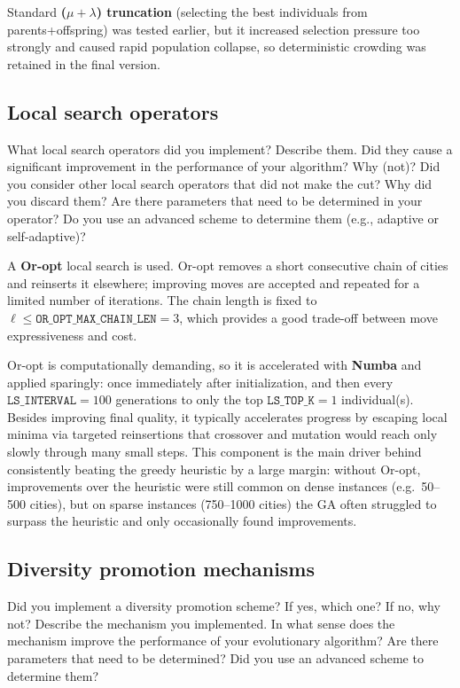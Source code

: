 \documentclass[a4paper,10pt]{article}
\newcommand{\ReplaceMe}[1]{{\color{blue}#1}}
\begin{document}
Standard \textbf{($\mu+\lambda$) truncation} (selecting the best individuals from parents+offspring) was tested
earlier, but it increased selection pressure too strongly and caused rapid population collapse, so deterministic
crowding was retained in the final version.


\subsection{Local search operators}

\ReplaceMe{What local search operators did you implement? Describe them. Did they cause a significant improvement in the performance of your algorithm? Why (not)? Did you consider other local search operators that did not make the cut? Why did you discard them? Are there parameters that need to be determined in your operator? Do you use an advanced scheme to determine them (e.g., adaptive or self-adaptive)?}

A \textbf{Or-opt} local search is used. Or-opt removes a short consecutive chain of cities and reinserts it
elsewhere; improving moves are accepted and repeated for a limited number of iterations. The chain length is
fixed to $\ell \leq \texttt{OR\_OPT\_MAX\_CHAIN\_LEN}=3$, which provides a good trade-off between move
expressiveness and cost.

Or-opt is computationally demanding, so it is accelerated with \textbf{Numba} and applied sparingly: once
immediately after initialization, and then every $\texttt{LS\_INTERVAL}=100$ generations to only the top
$\texttt{LS\_TOP\_K}=1$ individual(s). Besides improving final quality, it typically accelerates progress by
escaping local minima via targeted reinsertions that crossover and mutation would reach only slowly through many
small steps. This component is the main driver behind consistently beating the greedy heuristic by a large
margin: without Or-opt, improvements over the heuristic were still common on dense instances (e.g.\ 50--500
cities), but on sparse instances (750--1000 cities) the GA often struggled to surpass the heuristic and only
occasionally found improvements.

\subsection{Diversity promotion mechanisms}

\ReplaceMe{Did you implement a diversity promotion scheme? If yes, which one? If no, why not? Describe the mechanism you implemented. In what sense does the mechanism improve the performance of your evolutionary algorithm? Are there parameters that need to be determined? Did you use an advanced scheme to determine them?}
\end{document}
